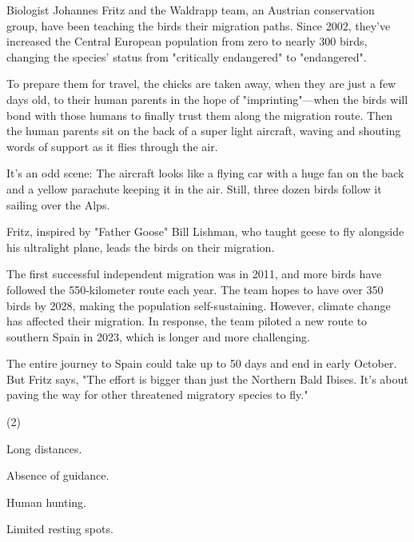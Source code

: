 \documentclass{英语试卷}
\begin{document}
\par Biologist Johannes Fritz and the Waldrapp team, an Austrian conservation group, have been teaching the birds their migration paths. Since 2002, they've increased the Central European population from zero to nearly 300 birds, changing the species' status from "critically endangered" to "endangered".\par
\par To prepare them for travel, the chicks are taken away, when they are just a few days old, to their human parents in the hope of "imprinting"—when the birds will bond with those humans to finally trust them along the migration route. Then the human parents sit on the back of a super light aircraft, waving and shouting words of support as it flies through the air.\par
\par It's an odd scene: The aircraft looks like a flying car with a huge fan on the back and a yellow parachute keeping it in the air. Still, three dozen birds follow it sailing over the Alps.\par
\par Fritz, inspired by "Father Goose" Bill Lishman, who taught geese to fly alongside his ultralight plane, leads the birds on their migration.\par
\par The first successful independent migration was in 2011, and more birds have followed the 550-kilometer route each year. The team hopes to have over 350 birds by 2028, making the population self-sustaining. However, climate change has affected their migration. In response, the team piloted a new route to southern Spain in 2023, which is longer and more challenging.\par
\par The entire journey to Spain could take up to 50 days and end in early October. But Fritz says, "The effort is bigger than just the Northern Bald Ibises. It's about paving the way for other threatened migratory species to fly."\par
{}
\begin{choices}(2)
  \item Long distances.
  \item Absence of guidance.
  \item Human hunting.
  \item Limited resting spots.
\end{choices}
\end{document}
